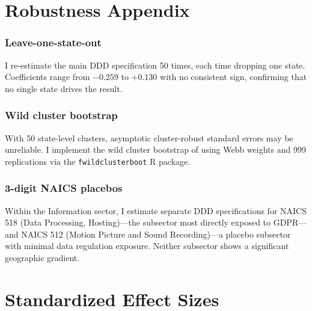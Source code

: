 \documentclass[12pt]{article}
\begin{document}
\section{Robustness Appendix}

\subsubsection*{Leave-one-state-out} I re-estimate the main DDD specification 50 times, each time dropping one state. Coefficients range from $-0.259$ to $+0.130$ with no consistent sign, confirming that no single state drives the result.

\subsubsection*{Wild cluster bootstrap} With 50 state-level clusters, asymptotic cluster-robust standard errors may be unreliable. I implement the wild cluster bootstrap of \citet{Cameron2008} using Webb weights and 999 replications via the \texttt{fwildclusterboot} R package.

\subsubsection*{3-digit NAICS placebos} Within the Information sector, I estimate separate DDD specifications for NAICS 518 (Data Processing, Hosting)---the subsector most directly exposed to GDPR---and NAICS 512 (Motion Picture and Sound Recording)---a placebo subsector with minimal data regulation exposure. Neither subsector shows a significant geographic gradient.

\section{Standardized Effect Sizes}
\label{sec:sde}


\end{document}
